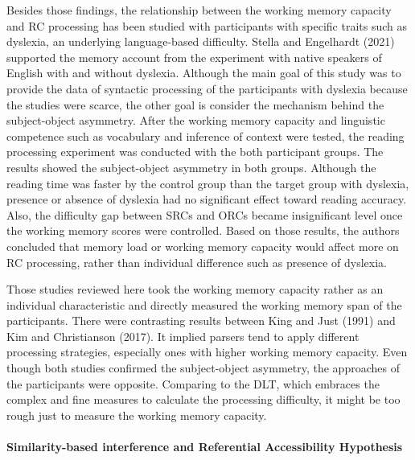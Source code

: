\documentclass[
]{article}
\begin{document}
Besides those findings, the relationship between the working memory
capacity and RC processing has been studied with participants with
specific traits such as dyslexia, an underlying language-based
difficulty. Stella and Engelhardt (2021) supported the memory account
from the experiment with native speakers of English with and without
dyslexia. Although the main goal of this study was to provide the data
of syntactic processing of the participants with dyslexia because the
studies were scarce, the other goal is consider the mechanism behind the
subject-object asymmetry. After the working memory capacity and
linguistic competence such as vocabulary and inference of context were
tested, the reading processing experiment was conducted with the both
participant groups. The results showed the subject-object asymmetry in
both groups. Although the reading time was faster by the control group
than the target group with dyslexia, presence or absence of dyslexia had
no significant effect toward reading accuracy. Also, the difficulty gap
between SRCs and ORCs became insignificant level once the working memory
scores were controlled. Based on those results, the authors concluded
that memory load or working memory capacity would affect more on RC
processing, rather than individual difference such as presence of
dyslexia.

Those studies reviewed here took the working memory capacity rather as
an individual characteristic and directly measured the working memory
span of the participants. There were contrasting results between King
and Just (1991) and Kim and Christianson (2017). It implied parsers tend
to apply different processing strategies, especially ones with higher
working memory capacity. Even though both studies confirmed the
subject-object asymmetry, the approaches of the participants were
opposite. Comparing to the DLT, which embraces the complex and fine
measures to calculate the processing difficulty, it might be too rough
just to measure the working memory capacity.

\paragraph{Similarity-based interference and Referential Accessibility
Hypothesis}\label{similarity-based-interference-and-referential-accessibility-hypothesis}
\end{document}
